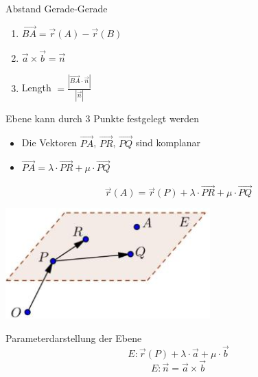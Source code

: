 \begin{KR}{Abstand Gerade-Gerade}
    \begin{enumerate}
        \item $\overrightarrow{BA} = \overrightarrow{r}(A) - \overrightarrow{r}(B)$
        \item $\overrightarrow{a} \times \overrightarrow{b} = \overrightarrow{n}$
        \item Length $= \frac{|\overrightarrow{BA} \cdot \overrightarrow{n}|}{|\overrightarrow{n}|}$
    \end{enumerate}
\end{KR}

\begin{definition}{Ebene}
    kann durch 3 Punkte festgelegt werden\\
    \begin{minipage}{0.65\linewidth}
    \begin{itemize}
        \item Die Vektoren $\overrightarrow{PA}$, $\overrightarrow{PR}$, $\overrightarrow{PQ}$ sind komplanar
        \item $\overrightarrow{PA} = \lambda \cdot \overrightarrow{PR} + \mu \cdot \overrightarrow{PQ}$
    \end{itemize}
    $$\overrightarrow{r}(A) = \overrightarrow{r}(P) + \lambda \cdot \overrightarrow{PR} + \mu \cdot \overrightarrow{PQ}$$
    \end{minipage}
    \begin{minipage}{0.3\linewidth}
        \includegraphics[width=1\linewidth]{ebene.png}
    \end{minipage}

    
\end{definition}

\begin{concept}{Parameterdarstellung} der Ebene
    $$E: \overrightarrow{r}(P) + \lambda \cdot \overrightarrow{a} + \mu \cdot \overrightarrow{b}$$
    $$E: \overrightarrow{n} = \overrightarrow{a} \times \overrightarrow{b}$$
\end{concept}
    
